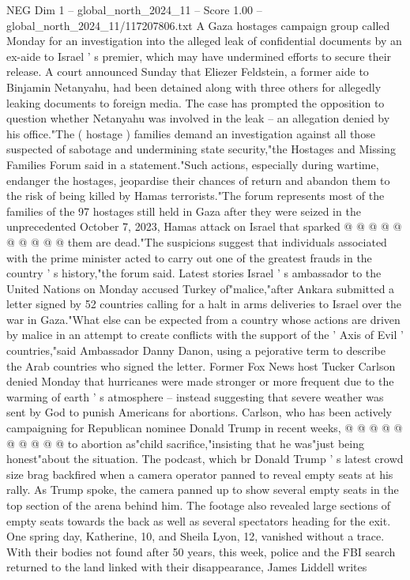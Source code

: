 \begin{textsample}{NEG Dim 1 – global\_north\_2024\_11 – Score 1.00 – global\_north\_2024\_11/117207806.txt}  \label{ex:f1_neg_224}
A Gaza hostages campaign group called Monday for an investigation into the alleged leak of confidential documents by an ex-aide to Israel ' s premier, which may have undermined efforts to secure their release.
A court announced Sunday that Eliezer Feldstein, a former aide to Binjamin Netanyahu, had been detained along with three others for allegedly leaking documents to foreign media.
The case has prompted the opposition to question whether Netanyahu was involved in the leak -- an allegation denied by his office."The ( hostage ) families demand an investigation against all those suspected of sabotage and undermining state security,"the Hostages and Missing Families Forum said in a statement."Such actions, especially during wartime, endanger the hostages, jeopardise their chances of return and abandon them to the risk of being killed by Hamas terrorists."The forum represents most of the families of the 97 hostages still held in Gaza after they were seized in the unprecedented October 7, 2023, Hamas attack on Israel that sparked @ @ @ @ @ @ @ @ @ @ them are dead."The suspicions suggest that individuals associated with the prime minister acted to carry out one of the greatest frauds in the country ' s history,"the forum said.
Latest stories Israel ' s ambassador to the United Nations on Monday accused Turkey of"malice,"after Ankara submitted a letter signed by 52 countries calling for a halt in arms deliveries to Israel over the war in Gaza."What else can be expected from a country whose actions are driven by malice in an attempt to create conflicts with the support of the ' Axis of Evil ' countries,"said Ambassador Danny Danon, using a pejorative term to describe the Arab countries who signed the letter.
Former Fox News host Tucker Carlson denied Monday that hurricanes were made stronger or more frequent due to the warming of earth ' s atmosphere -- instead suggesting that severe weather was sent by God to punish Americans for abortions.
Carlson, who has been actively campaigning for Republican nominee Donald Trump in recent weeks, @ @ @ @ @ @ @ @ @ @ to abortion as"child sacrifice,"insisting that he was"just being honest"about the situation.
The podcast, which br Donald Trump ' s latest crowd size brag backfired when a camera operator panned to reveal empty seats at his rally.
As Trump spoke, the camera panned up to show several empty seats in the top section of the arena behind him.
The footage also revealed large sections of empty seats towards the back as well as several spectators heading for the exit.
One spring day, Katherine, 10, and Sheila Lyon, 12, vanished without a trace.
With their bodies not found after 50 years, this week, police and the FBI search returned to the land linked with their disappearance, James Liddell writes

\end{textsample}
